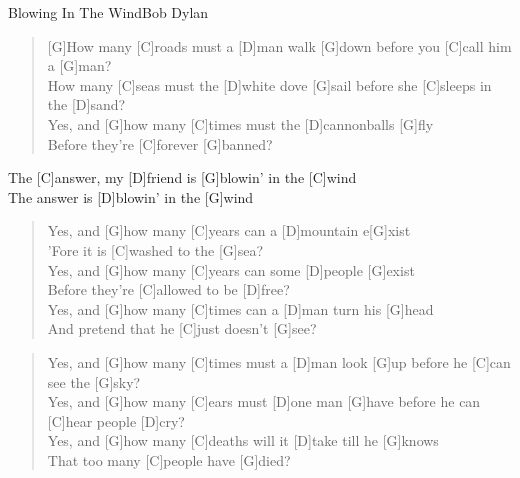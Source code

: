 \begin{song}{Blowing In The Wind}{Bob Dylan}

    \begin{verse}  
        [G]How many [C]roads must a [D]man walk [G]down before you [C]call him a [G]man? \\
        [G]How many [C]seas must the [D]white dove [G]sail before she [C]sleeps in the [D]sand? \\
        Yes, and [G]how many [C]times must the [D]cannonballs [G]fly \\
        Before they're [C]forever [G]banned?
    \end{verse}  

    \begin{chorus}
        The [C]answer, my [D]friend is [G]blowin' in the [C]wind \\
        The answer is [D]blowin' in the [G]wind
    \end{chorus}

    \begin{verse}  
        Yes, and [G]how many [C]years can a [D]mountain e[G]xist \\
        'Fore it is [C]washed to the [G]sea? \\
        Yes, and [G]how many [C]years can some [D]people [G]exist \\
        Before they're [C]allowed to be [D]free? \\
        Yes, and [G]how many [C]times can a [D]man turn his [G]head \\
        And pretend that he [C]just doesn't [G]see?
    \end{verse}  


    \begin{verse}  
        Yes, and [G]how many [C]times must a [D]man look [G]up before he [C]can see the [G]sky? \\
        Yes, and [G]how many [C]ears must [D]one man [G]have before he can [C]hear people [D]cry? \\
        Yes, and [G]how many [C]deaths will it [D]take till he [G]knows \\
        That too many [C]people have [G]died? 
    \end{verse}  


\end{song}


        
        

